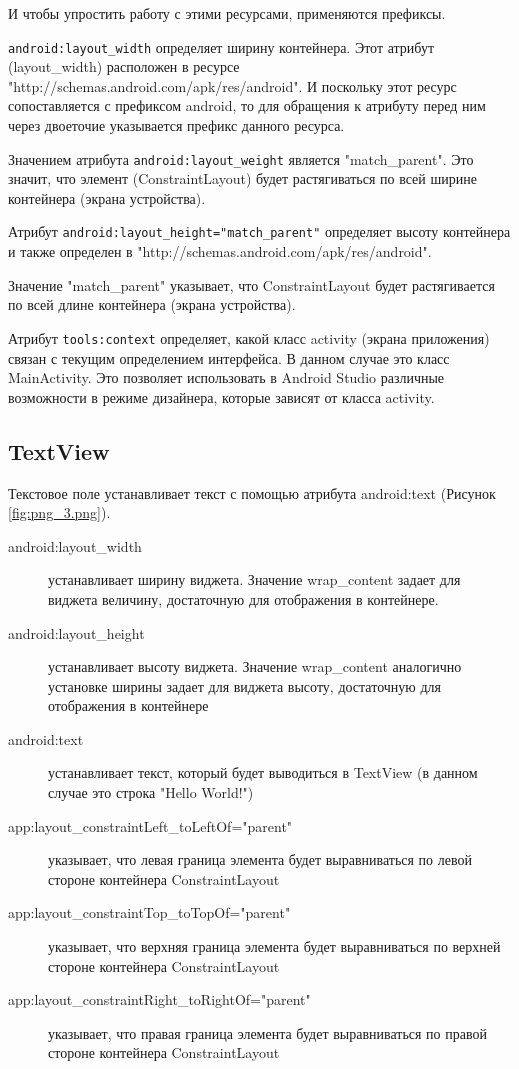 И чтобы упростить работу с этими ресурсами, применяются префиксы.\par
\texttt{android:layout\_width} определяет ширину контейнера. Этот атрибут
(layout\_width) расположен в ресурсе
"http://schemas.android.com/apk/res/android". И поскольку этот ресурс
сопоставляется с префиксом android, то для обращения к атрибуту перед ним
через двоеточие указывается префикс данного ресурса.\par
Значением атрибута \texttt{android:layout\_weight} является
"match\_parent". Это значит, что элемент (ConstraintLayout)
будет растягиваться по всей ширине контейнера (экрана устройства).\par
Атрибут \texttt{android:layout\_height="match\_parent"} определяет высоту
контейнера и также определен в
"http://schemas.android.com/apk/res/android".\par
Значение "match\_parent" указывает, что ConstraintLayout
будет растягивается по всей длине контейнера (экрана устройства).\par
Атрибут \texttt{tools:context} определяет, какой класс
activity (экрана приложения) связан с текущим определением интерфейса.
В данном случае это класс MainActivity. Это позволяет использовать
в Android Studio различные возможности в режиме дизайнера,
которые зависят от класса activity.

\subsection{TextView}
Текстовое поле устанавливает текст с помощью атрибута android:text
(Рисунок \ref{fig:png_3.png}).


\begin{description}
	\item[android:layout\_width] устанавливает ширину виджета. Значение
		wrap\_content задает для виджета величину, достаточную для
		отображения в контейнере.
	\item[android:layout\_height] устанавливает высоту виджета. Значение
		wrap\_content аналогично установке ширины задает для виджета высоту,
		достаточную для отображения в контейнере
	\item[android:text] устанавливает текст, который будет выводиться
		в TextView (в данном случае это строка "Hello World!")
	\item[app:layout\_constraintLeft\_toLeftOf="parent"] указывает, что левая
		граница элемента будет выравниваться по левой стороне контейнера
		ConstraintLayout
	\item[app:layout\_constraintTop\_toTopOf="parent"] указывает, что верхняя
		граница элемента будет выравниваться по верхней стороне контейнера
		ConstraintLayout
	\item[app:layout\_constraintRight\_toRightOf="parent"] указывает,
		что правая граница элемента будет выравниваться по правой стороне
		контейнера ConstraintLayout
\end{description}

